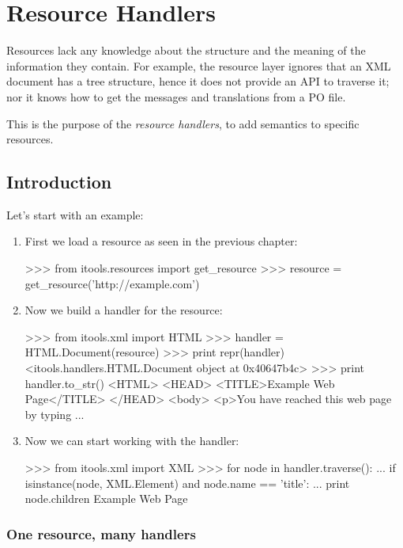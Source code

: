 \chapter{Resource Handlers}

Resources lack any knowledge about the structure and the meaning of
the information they contain. For example, the resource layer ignores
that an XML document has a tree structure, hence it does not provide
an API to traverse it; nor it knows how to get the messages and
translations from a PO file.

This is the purpose of the {\em resource handlers}, to add semantics to
specific resources.


\section{Introduction}

Let's start with an example:

\begin{enumerate}
  \item First we load a resource as seen in the previous chapter:
\begin{code}
    >>> from itools.resources import get_resource
    >>> resource = get_resource('http://example.com')
\end{code}

  \item Now we build a handler for the resource:
\begin{code}
    >>> from itools.xml import HTML
    >>> handler = HTML.Document(resource)
    >>> print repr(handler)
    <itools.handlers.HTML.Document object at 0x40647b4c>
    >>> print handler.to_str()
    <HTML>
    <HEAD>
      <TITLE>Example Web Page</TITLE>
    </HEAD> 
    <body>  
    <p>You have reached this web page by typing
    ...
\end{code}

  \item Now we can start working with the handler:
\begin{code}
    >>> from itools.xml import XML
    >>> for node in handler.traverse():
    ...     if isinstance(node, XML.Element) and node.name == 'title':
    ...         print node.children
    Example Web Page
\end{code}
\end{enumerate}


\subsection{One resource, many handlers}

